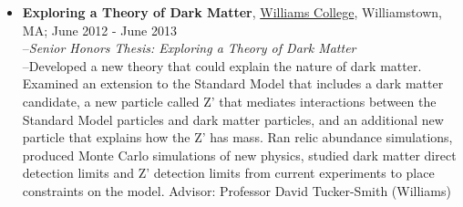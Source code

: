 \begin{itemize}
\item{\textbf{Exploring a Theory of Dark Matter}, \href{http://physics.williams.edu}{Williams College}, Williamstown, MA; June 2012 - June 2013\\
--\textit{Senior Honors Thesis: Exploring a Theory of Dark Matter}\\
--Developed a new theory that could explain the nature of dark matter. Examined an extension to the Standard Model that includes a dark matter candidate, a new particle called Z' that mediates interactions between the Standard Model particles and dark matter particles, and an additional new particle that explains how the Z' has mass. Ran relic abundance simulations, produced Monte Carlo simulations of new physics, studied dark matter direct detection limits and Z' detection limits from current experiments to place constraints on the model. Advisor: Professor David Tucker-Smith (Williams)\\}

\end{itemize}
